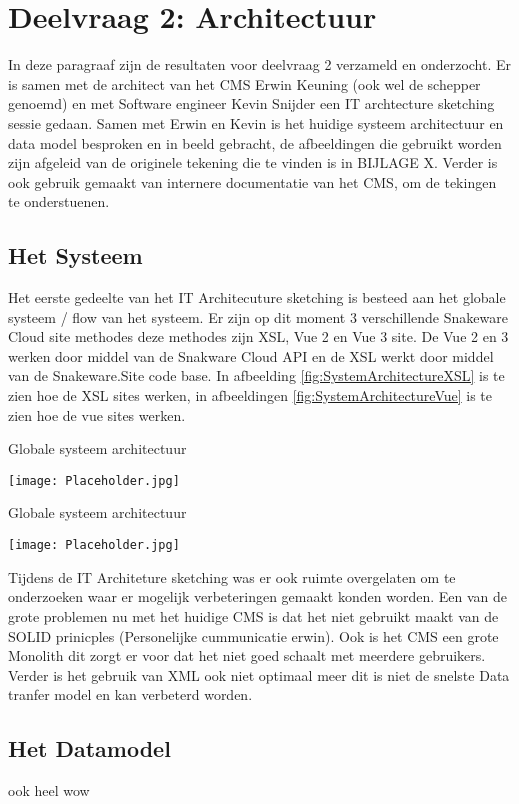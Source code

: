 \section{Deelvraag 2: Architectuur}
In deze paragraaf zijn de resultaten voor deelvraag 2 \textit{\SubquestionTwo} verzameld en onderzocht.
Er is samen met de architect van het CMS Erwin Keuning (ook wel de schepper genoemd) en met Software engineer Kevin Snijder een IT archtecture sketching sessie gedaan.
Samen met Erwin en Kevin is het huidige systeem architectuur en data model besproken en in beeld gebracht, de afbeeldingen die gebruikt worden zijn afgeleid van de originele tekening die te vinden is in BIJLAGE X.
Verder is ook gebruik gemaakt van internere documentatie van het CMS, om de tekingen te onderstuenen.
\subsection{Het Systeem}
Het eerste gedeelte van het IT Architecuture sketching is besteed aan het globale systeem / flow van het systeem.
Er zijn op dit moment 3 verschillende Snakeware Cloud site methodes deze methodes zijn XSL, Vue 2 en Vue 3 site.
De Vue 2 en 3 werken door middel van de Snakware Cloud API en de XSL werkt door middel van de Snakeware.Site code base.
In afbeelding \ref{fig:SystemArchitectureXSL} is te zien hoe de XSL sites werken, in afbeeldingen \ref{fig:SystemArchitectureVue} is te zien hoe de vue sites werken. 

\whitespace
\begin{graphic}
	\captionsetup{type=figure}
	\caption{Globale systeem architectuur}
	\texttt{[image: Placeholder.jpg]}
	\label{fig:SystemArchitectureXSL}
\end{graphic}

\whitespace
\begin{graphic}
    \captionsetup{type=figure}
    \caption{Globale systeem architectuur}
    \texttt{[image: Placeholder.jpg]}
    \label{fig:SystemArchitectureVue}
\end{graphic}

Tijdens de IT Architeture sketching was er ook ruimte overgelaten om te onderzoeken waar er mogelijk verbeteringen gemaakt konden worden.
Een van de grote problemen nu met het huidige CMS is dat het niet gebruikt maakt van de SOLID prinicples (Personelijke cummunicatie erwin).
Ook is het CMS een grote Monolith dit zorgt er voor dat het niet goed schaalt met meerdere gebruikers.
Verder is het gebruik van XML ook niet optimaal meer dit is niet de snelste Data tranfer model en kan verbeterd worden.


\subsection{Het Datamodel}
ook heel wow
